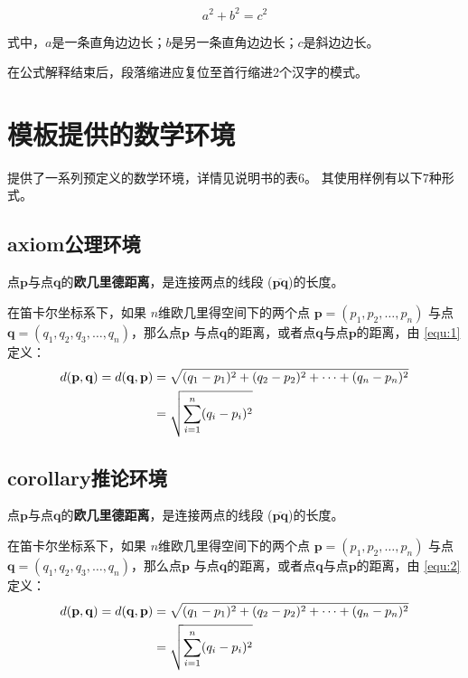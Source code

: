 \begin{equation}
  a^2+b^2=c^2\label{eq:gougu}
\end{equation}

\noindent
式中，$a$是一条直角边边长；$b$是另一条直角边边长；$c$是斜边边长。

在公式解释结束后，段落缩进应复位至首行缩进2个汉字的模式。

\section{模板提供的数学环境}

\nwafuthesis{} 提供了一系列预定义的数学环境，详情见\nwafuthesis{}说明书的表6。
其使用样例有以下7种形式。

\subsection{axiom公理环境}

\begin{axiom}[欧几里得距离]
点$\mathbf{p}$与点$\mathbf{q}$的\textbf{欧几里德距离}，是连接两点的线段
($\overline{\mathbf{pq}}$)的长度。

在笛卡尔坐标系下，如果 $n$维欧几里得空间下的两个点 $\mathbf{p}=(p_1, p_2,
\dots, p_n)$ 与点$\mathbf{q} = (q_1, q_2, q_3, \dots, q_n)$，那么点$\mathbf{p}$
与点$\mathbf{q}$的距离，或者点$\mathbf{q}$与点$\mathbf{p}$的距离，由
\autoref{equ:1}定义：
\begin{align}
d(\mathbf{p},\mathbf{q}) = d(\mathbf{q},\mathbf{p}) & = \sqrt{(q_1-p_1)^2
                         + (q_2-p_2)^2 + \cdots + (q_n-p_n)^2} \notag \\
\label{equ:1}
& = \sqrt{\sum_{i=1}^n (q_i-p_i)^2}
\end{align}
\end{axiom}

\subsection{corollary推论环境}

\begin{corollary}[欧几里得距离]
点$\mathbf{p}$与点$\mathbf{q}$的\textbf{欧几里德距离}，是连接两点的线段
($\overline{\mathbf{pq}}$)的长度。

在笛卡尔坐标系下，如果 $n$维欧几里得空间下的两个点 $\mathbf{p}=(p_1, p_2,
\dots, p_n)$ 与点$\mathbf{q} = (q_1, q_2, q_3, \dots, q_n)$，那么点$\mathbf{p}$
与点$\mathbf{q}$的距离，或者点$\mathbf{q}$与点$\mathbf{p}$的距离，由
\autoref{equ:2}定义：
\begin{align}
d(\mathbf{p},\mathbf{q}) = d(\mathbf{q},\mathbf{p}) & = \sqrt{(q_1-p_1)^2
                         + (q_2-p_2)^2 + \cdots + (q_n-p_n)^2} \notag \\
\label{equ:2}
& = \sqrt{\sum_{i=1}^n (q_i-p_i)^2}
\end{align}
\end{corollary}

